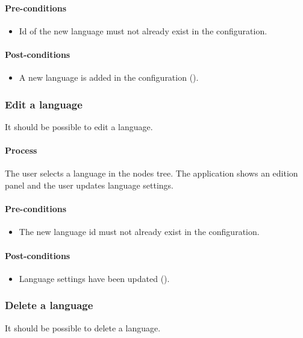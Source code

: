 \documentclass[11pt,a4paper,oneside]{article}
\begin{document}
\paragraph{Pre-conditions}
\begin{itemize}
	\item Id of the new language must not already exist in the configuration.
\end{itemize}

\paragraph{Post-conditions}
\begin{itemize}
	\item A new language is added in the configuration ().
\end{itemize}

\subsubsection{Edit a language}
It should be possible to edit a language.

\paragraph{Process}
The user selects a language in the nodes tree. The application shows an edition panel and the user updates language settings.

\paragraph{Pre-conditions}
\begin{itemize}
	\item The new language id must not already exist in the configuration.
\end{itemize}

\paragraph{Post-conditions}
\begin{itemize}
	\item Language settings have been updated ().
\end{itemize}

\subsubsection{Delete a language}
It should be possible to delete a language.
\end{document}
